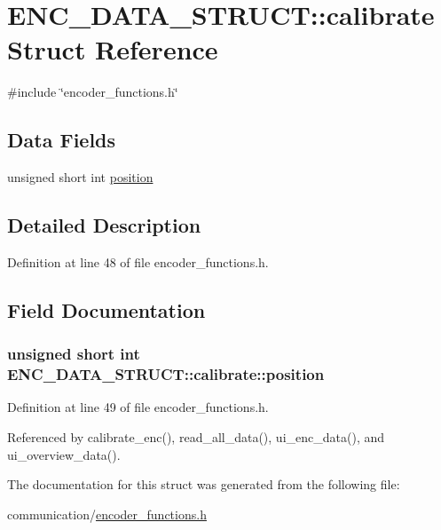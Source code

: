 \hypertarget{structENC__DATA__STRUCT_1_1calibrate}{\section{E\-N\-C\-\_\-\-D\-A\-T\-A\-\_\-\-S\-T\-R\-U\-C\-T\-:\-:calibrate Struct Reference}
\label{structENC__DATA__STRUCT_1_1calibrate}
}


{\ttfamily \#include \char`\"{}encoder\-\_\-functions.\-h\char`\"{}}

\subsection*{Data Fields}
\begin{DoxyCompactItemize}
\item 
unsigned short int \hyperlink{structENC__DATA__STRUCT_1_1calibrate_aed5100f7dc3d1f358a633c043e13cba2}{position}
\end{DoxyCompactItemize}


\subsection{Detailed Description}


Definition at line 48 of file encoder\-\_\-functions.\-h.



\subsection{Field Documentation}
\hypertarget{structENC__DATA__STRUCT_1_1calibrate_aed5100f7dc3d1f358a633c043e13cba2}{
\subsubsection[{position}]{\setlength{\rightskip}{0pt plus 5cm}unsigned short int E\-N\-C\-\_\-\-D\-A\-T\-A\-\_\-\-S\-T\-R\-U\-C\-T\-::calibrate\-::position}}\label{structENC__DATA__STRUCT_1_1calibrate_aed5100f7dc3d1f358a633c043e13cba2}


Definition at line 49 of file encoder\-\_\-functions.\-h.



Referenced by calibrate\-\_\-enc(), read\-\_\-all\-\_\-data(), ui\-\_\-enc\-\_\-data(), and ui\-\_\-overview\-\_\-data().



The documentation for this struct was generated from the following file\-:\begin{DoxyCompactItemize}
\item 
communication/\hyperlink{encoder__functions_8h}{encoder\-\_\-functions.\-h}\end{DoxyCompactItemize}
